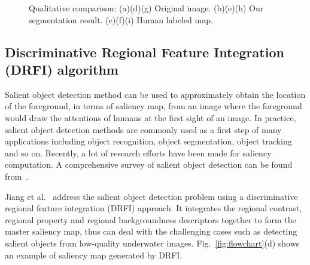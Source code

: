 \documentclass[conference]{IEEEtran}
\begin{document}
\begin{figure}[!t]
  \caption{Qualitative comparison: (a)(d)(g) Original image. (b)(e)(h) Our segmentation result. (c)(f)(i) Human labeled map.}
  \label{fig:comparison} %
\end{figure}

\subsection{Discriminative Regional Feature Integration (DRFI) algorithm}

Salient object detection method can be used to approximately obtain the location of the foreground, in terms of saliency map, from an image where the foreground would draw the attentions of humans at the first sight of an image. In practice, salient object detection methods are commonly used as a first step of many applications including object recognition, object segmentation, object tracking and so on. Recently, a lot of research efforts have been made for saliency computation. A comprehensive survey of salient object detection can be found from~\cite{borji2014salientsurvey}.

Jiang et al.~\cite{jiang2013salient} address the salient object detection problem using a discriminative regional feature integration (DRFI) approach. It integrates the regional contrast, regional property and regional backgroundness descriptors together to form the master saliency map, thus can deal with the challenging cases such as detecting salient objects from low-quality underwater images. Fig.~\ref{fig:flowchart}(d) shows an example of saliency map generated by DRFI.
\end{document}
